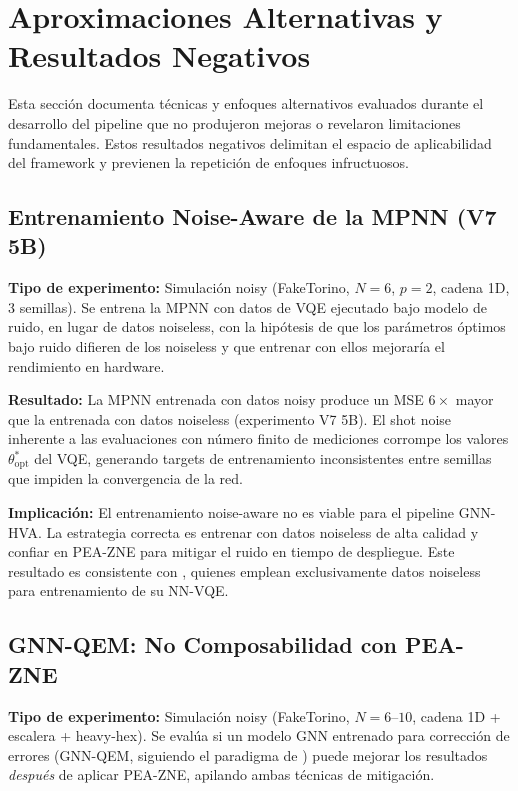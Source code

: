 \documentclass[11pt,a4paper,spanish]{book}
\begin{document}
\section{Aproximaciones Alternativas y Resultados Negativos}

Esta sección documenta técnicas y enfoques alternativos evaluados durante el desarrollo del pipeline que no produjeron mejoras o revelaron limitaciones fundamentales. Estos resultados negativos delimitan el espacio de aplicabilidad del framework y previenen la repetición de enfoques infructuosos.

\subsection{Entrenamiento Noise-Aware de la MPNN (V7 5B)}

\textbf{Tipo de experimento:} Simulación noisy (FakeTorino, $N = 6$, $p = 2$, cadena 1D, 3 semillas). Se entrena la MPNN con datos de VQE ejecutado bajo modelo de ruido, en lugar de datos noiseless, con la hipótesis de que los parámetros óptimos bajo ruido difieren de los noiseless y que entrenar con ellos mejoraría el rendimiento en hardware.

\textbf{Resultado:} La MPNN entrenada con datos noisy produce un MSE $6\times$ mayor que la entrenada con datos noiseless (experimento V7 5B). El shot noise inherente a las evaluaciones con número finito de mediciones corrompe los valores $\theta^*_{\text{opt}}$ del VQE, generando targets de entrenamiento inconsistentes entre semillas que impiden la convergencia de la red.

\textbf{Implicación:} El entrenamiento noise-aware no es viable para el pipeline GNN-HVA. La estrategia correcta es entrenar con datos noiseless de alta calidad y confiar en PEA-ZNE \citep{kim2023} para mitigar el ruido en tiempo de despliegue. Este resultado es consistente con \citet{miao2024}, quienes emplean exclusivamente datos noiseless para entrenamiento de su NN-VQE.

\subsection{GNN-QEM: No Composabilidad con PEA-ZNE}

\textbf{Tipo de experimento:} Simulación noisy (FakeTorino, $N = 6$--$10$, cadena 1D + escalera + heavy-hex). Se evalúa si un modelo GNN entrenado para corrección de errores (GNN-QEM, siguiendo el paradigma de \citet{wang2024}) puede mejorar los resultados \emph{después} de aplicar PEA-ZNE, apilando ambas técnicas de mitigación.
\end{document}
